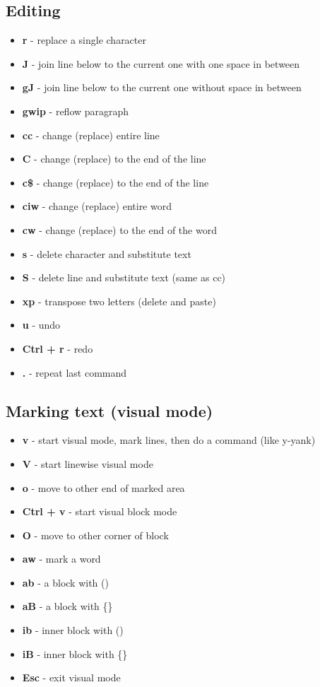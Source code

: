 \documentclass[twocolumn]{article}
\providecommand{\tightlist}{%
  \setlength{\itemsep}{0pt}\setlength{\parskip}{0pt}}
\begin{document}
\hypertarget{editing}{%
\subsection{Editing}\label{editing}}

\begin{itemize}
\tightlist
\item
  \textbf{r} - replace a single character
\item
  \textbf{J} - join line below to the current one with one space in
  between
\item
  \textbf{gJ} - join line below to the current one without space in
  between
\item
  \textbf{gwip} - reflow paragraph
\item
  \textbf{cc} - change (replace) entire line
\item
  \textbf{C} - change (replace) to the end of the line
\item
  \textbf{c\$} - change (replace) to the end of the line
\item
  \textbf{ciw} - change (replace) entire word
\item
  \textbf{cw} - change (replace) to the end of the word
\item
  \textbf{s} - delete character and substitute text
\item
  \textbf{S} - delete line and substitute text (same as cc)
\item
  \textbf{xp} - transpose two letters (delete and paste)
\item
  \textbf{u} - undo
\item
  \textbf{Ctrl + r} - redo
\item
  \textbf{.} - repeat last command
\end{itemize}

\hypertarget{marking-text-visual-mode}{%
\subsection{Marking text (visual mode)}\label{marking-text-visual-mode}}

\begin{itemize}
\tightlist
\item
  \textbf{v} - start visual mode, mark lines, then do a command (like
  y-yank)
\item
  \textbf{V} - start linewise visual mode
\item
  \textbf{o} - move to other end of marked area
\item
  \textbf{Ctrl + v} - start visual block mode
\item
  \textbf{O} - move to other corner of block
\item
  \textbf{aw} - mark a word
\item
  \textbf{ab} - a block with ()
\item
  \textbf{aB} - a block with \{\}
\item
  \textbf{ib} - inner block with ()
\item
  \textbf{iB} - inner block with \{\}
\item
  \textbf{Esc} - exit visual mode
\end{itemize}
\end{document}
